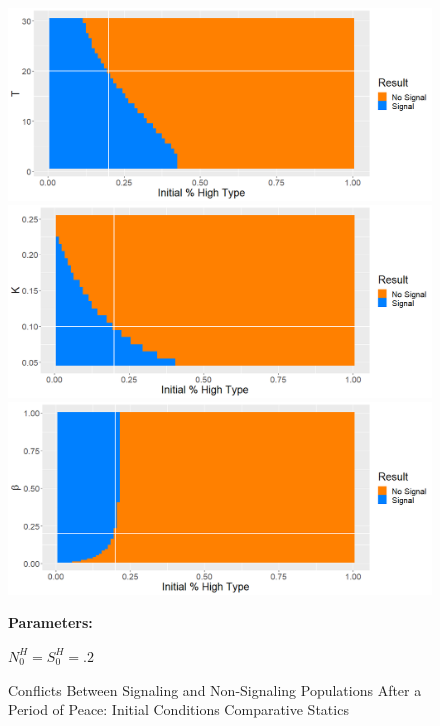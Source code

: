 \begin{figure}[p]
  \caption{Conflicts Between Signaling and Non-Signaling Populations After a Period of Peace: Initial Conditions Comparative Statics}
   \label{fig:RatioRegions}
    \includegraphics[width=\textwidth, height=.28\textheight]{Images/Region_RT.png}
    \includegraphics[width=\textwidth, height=.28\textheight]{Images/Region_RK.png}
    \includegraphics[width=\textwidth, height=.28\textheight]{Images/Region_RB.png}
 \begin{minipage}[c]{.2\textwidth}
    \textbf{Parameters:}
    \end{minipage}\hfill
    \begin{minipage}[c]{.2\textwidth}
    
    $N_0^H = S_0^H = .2$
    

\end{minipage}
\end{figure}

